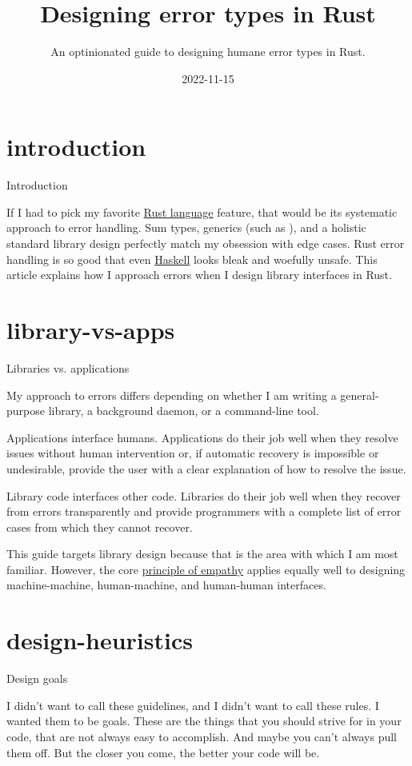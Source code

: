 \documentclass{article}
\title{Designing error types in Rust}
\subtitle{An optinionated guide to designing humane error types in Rust.}
\date{2022-11-15}
\begin{document}
\section{introduction}{Introduction}

If I had to pick my favorite \href{https://www.rust-lang.org/}{Rust language} feature, that would be its systematic approach to error handling.
Sum types, generics (such as \href{https://doc.rust-lang.org/std/result/enum.Result.html}{}), and a holistic standard library design perfectly match my obsession with edge cases.
Rust error handling is so good that even \href{https://haskell.org/}{Haskell} looks bleak and woefully unsafe.
This article explains how I approach errors when I design library interfaces in Rust.

\section{library-vs-apps}{Libraries vs. applications}

My approach to errors differs depending on whether I am writing a general-purpose library, a background daemon, or a command-line tool.

Applications interface humans.
Applications do their job well when they resolve issues without human intervention or, if automatic recovery is impossible or undesirable, provide the user with a clear explanation of how to resolve the issue.

Library code interfaces other code.
Libraries do their job well when they recover from errors transparently and provide programmers with a complete list of error cases from which they cannot recover.

This guide targets library design because that is the area with which I am most familiar.
However, the core \href{#empathy}{principle of empathy} applies equally well to designing machine-machine, human-machine, and human-human interfaces.

\section{design-heuristics}{Design goals}
\epigraph{
  I didn't want to call these guidelines, and I didn't want to call these rules.
  I wanted them to be goals.
  These are the things that you should strive for in your code, that are not always easy to accomplish.
  And maybe you can't always pull them off.
  But the closer you come, the better your code will be.
}{}
\end{document}
